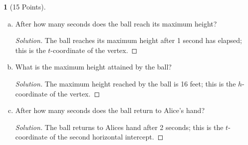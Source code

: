 \documentclass[12pt]{amsart}
\theoremstyle{definition}
\newtheorem{thm}{}
\begin{document}
\begin{thm}[15 Points]
    \begin{enumerate}[(a)]
  \item
    After how many seconds does the ball reach its maximum height?
    \begin{proof}[Solution]
      The ball reaches its maximum height after 1 second has elapsed; this is the $t$-coordinate of the vertex.
    \end{proof}
  \item
    What is the maximum height attained by the ball?
    \begin{proof}[Solution]
      The maximum height reached by the ball is 16 feet; this is the $h$-coordinate of the vertex.
    \end{proof}
  \item
    After how many seconds does the ball return to Alice's hand?
    \begin{proof}[Solution]
      The ball returns to Alices hand after 2 seconds; this is the $t$-coordinate of the second horizontal intercept.
    \end{proof}
  \end{enumerate}
\end{thm}
\end{document}
